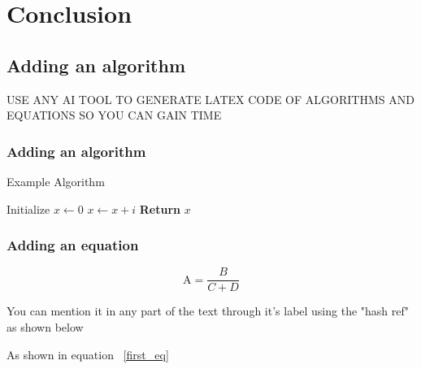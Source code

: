 \chapter{Conclusion}
\vspace{2em}

\section{Adding an algorithm}

 USE ANY AI TOOL TO GENERATE LATEX CODE OF ALGORITHMS AND EQUATIONS SO YOU CAN GAIN TIME 

\subsection{Adding an algorithm}

\begin{algorithm}
\caption{Example Algorithm}
\begin{algorithmic}[1]  %
\State Initialize $x \gets 0$
    \State $x \gets x + i$
\EndFor
\State \textbf{Return} $x$
\end{algorithmic}
\end{algorithm}

\subsection{Adding an equation}
        \begin{equation}
        \text{A} = \frac{B}{C + D} 
        \label{first_eq}
        \end{equation}
        
You can mention it in any part of the text through it's label using the "hash ref" as shown below 

As shown in equation ~\ref{first_eq} %